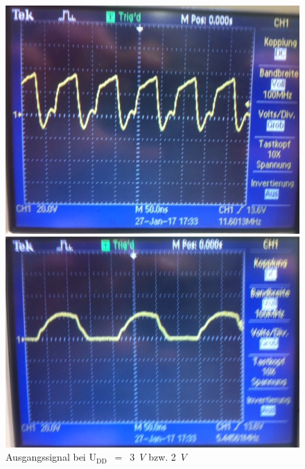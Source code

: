 \begin{figure}[!h]
\begin{minipage}[t]{0.5\textwidth}
\includegraphics[width=\textwidth]{bild/Inverter3V}
\end{minipage}
\hfill
\begin{minipage}[t]{0.5\textwidth}
\includegraphics[width=\textwidth]{bild/Inverter2V}
\end{minipage}
\caption{Ausgangssignal bei U$_{\text{DD}}$~$=$~3~$V$ bzw. 2~$V$}
\begin{center}
\begin{minipage}[t]{0.5\textwidth}

\end{minipage}
\end{center}
\end{figure}
